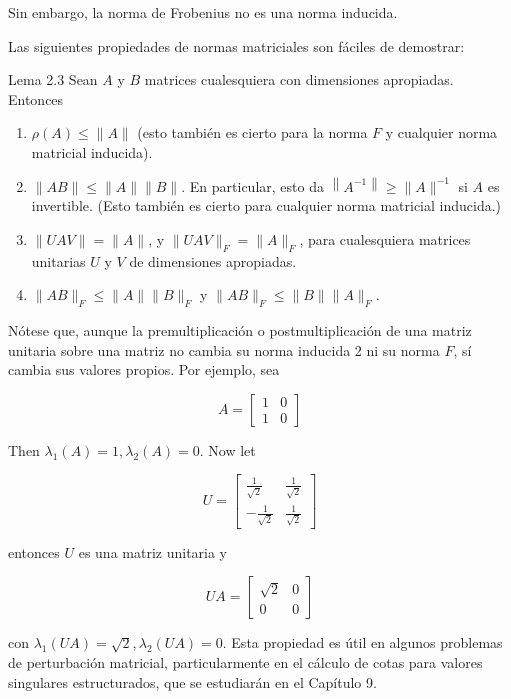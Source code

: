 Sin embargo, la norma de Frobenius no es una norma inducida.

Las siguientes propiedades de normas matriciales son fáciles de demostrar:

Lema 2.3 Sean $A$ y $B$ matrices cualesquiera con dimensiones apropiadas. Entonces

\begin{enumerate}
  \item $\rho(A) \leq\|A\|$ (esto también es cierto para la norma $F$ y cualquier norma matricial inducida).
  \item $\|A B\| \leq\|A\|\|B\|$. En particular, esto da $\left\|A^{-1}\right\| \geq\|A\|^{-1}$ si $A$ es invertible. (Esto también es cierto para cualquier norma matricial inducida.)
  \item $\|U A V\|=\|A\|$, y $\|U A V\|_{F}=\|A\|_{F}$, para cualesquiera matrices unitarias $U$ y $V$ de dimensiones apropiadas.
  \item $\|A B\|_{F} \leq\|A\|\|B\|_{F}$ y $\|A B\|_{F} \leq\|B\|\|A\|_{F}$.
\end{enumerate}

Nótese que, aunque la premultiplicación o postmultiplicación de una matriz unitaria sobre una matriz no cambia su norma inducida 2 ni su norma $F$, sí cambia sus valores propios. Por ejemplo, sea

$$
A=\left[\begin{array}{ll}
1 & 0 \\
1 & 0
\end{array}\right]
$$

Then $\lambda_{1}(A)=1, \lambda_{2}(A)=0$. Now let

$$
U=\left[\begin{array}{cc}
\frac{1}{\sqrt{2}} & \frac{1}{\sqrt{2}} \\
-\frac{1}{\sqrt{2}} & \frac{1}{\sqrt{2}}
\end{array}\right]
$$

entonces $U$ es una matriz unitaria y

$$
U A=\left[\begin{array}{cc}
\sqrt{2} & 0 \\
0 & 0
\end{array}\right]
$$

con $\lambda_{1}(U A)=\sqrt{2}, \lambda_{2}(U A)=0$. Esta propiedad es útil en algunos problemas de perturbación matricial, particularmente en el cálculo de cotas para valores singulares estructurados, que se estudiarán en el Capítulo 9.

